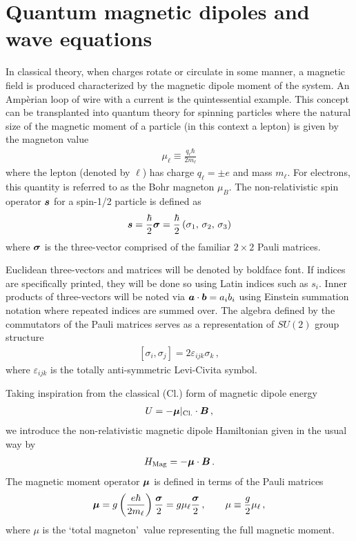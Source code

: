 \section{Quantum magnetic dipoles and wave equations}
\label{sec:mom}
In classical theory, when charges rotate or circulate in some manner, a magnetic field is produced characterized by the magnetic dipole moment of the system. An Amp{\`e}rian loop of wire with a current is the quintessential example. This concept can be transplanted into quantum theory for spinning particles where the natural size of the magnetic moment of a particle (in this context a lepton) is given by the magneton value
\begin{gather}
    \label{mag:1}
    \mu_{\ell}\equiv\frac{q_{\ell}\hbar}{2m_{\ell}}
\end{gather}
where the lepton (denoted by $\ell$) has charge $q_{\ell}=\pm e$ and mass $m_{\ell}$. For electrons, this quantity is referred to as the Bohr magneton $\mu_{B}$. The non-relativistic spin operator $\boldsymbol{s}$ for a spin-1/2 particle is defined as
\begin{gather}
    \label{qspin:1}
    \boldsymbol{ s}=\frac{\hbar}{2}\boldsymbol{\sigma}=\frac{\hbar}{2}\left(\sigma_{1},\,\sigma_{2},\,\sigma_{3}\right)
\end{gather}
where $\boldsymbol{\sigma}$ is the three-vector comprised of the familiar $2\times2$ Pauli matrices.

Euclidean three-vectors and matrices will be denoted by boldface font. If indices are specifically printed, they will be done so using Latin indices such as $s_{i}$. Inner products of three-vectors will be noted via $\boldsymbol{a}\cdot\boldsymbol{b}=a_{i}b_{i}$ using Einstein summation notation where repeated indices are summed over. The algebra defined by the commutators of the Pauli matrices serves as a representation of $SU(2)$ group structure
\begin{gather}
    \label{pauli:1}
    [\sigma_{i},\sigma_{j}] = 2\varepsilon_{ijk}\sigma_{k}\,,
\end{gather}
where $\varepsilon_{ijk}$ is the totally anti-symmetric Levi-Civita symbol.

Taking inspiration from the classical (Cl.) form of magnetic dipole energy
\begin{gather}
    \label{magenergy:1}
    U=-\boldsymbol{\mu}\vert_{\rm Cl.}\cdot\boldsymbol{B}\,,
\end{gather}
we introduce the non-relativistic magnetic dipole Hamiltonian given in the usual way by
\begin{gather}
	\label{mag:2}
    {H}_{\mathrm{Mag}}=-\boldsymbol{\mu}\cdot\boldsymbol{B}\,.
\end{gather}
The magnetic moment operator $\boldsymbol{\mu}$ is defined in terms of the Pauli matrices
\begin{gather}
    \label{mag:3}
    \boldsymbol{\mu}=g\left(\frac{e\hbar}{2m_{\ell}}\right)\frac{\boldsymbol{\sigma}}{2}=g\mu_{\ell}\frac{\boldsymbol{\sigma}}{2}\,,\qquad\mu\equiv\frac{g}{2}\mu_{\ell}\,,
\end{gather}
where $\mu$ is the \lq total magneton\rq\ value representing the full magnetic moment.

